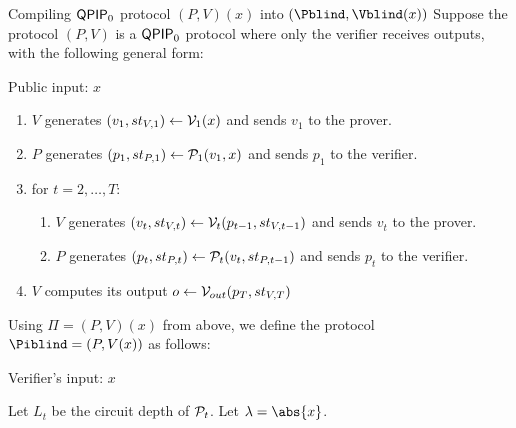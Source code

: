 \begin{protocol}{Compiling $\operatorname{\mathsf{QPIP}}_0$ protocol $(P, V)(x)$ into $(\Pblind, \Vblind(x))$}
	Suppose the protocol $(P, V)$ is a $\operatorname{\mathsf{QPIP}}_0$ protocol where only the verifier receives outputs, with the following general form:
	
	Public input: $x$
	\begin{enumerate}
		\item $V$ generates $(v_1, st_{V, 1})\leftarrow\mathcal{V}_1(x)$ and sends $v_1$ to the prover.
		\item $P$ generates $(p_1, st_{P, 1})\leftarrow\mathcal{P}_1(v_1, x)$ and sends $p_1$ to the verifier.
		\item for $t=2,\ldots,T$:
		\begin{enumerate}
			\item $V$ generates $(v_t, st_{V, t})\leftarrow\mathcal{V}_t(p_{t-1}, st_{V, t-1})$ and sends $v_t$ to the prover.
			\item $P$ generates $(p_t, st_{P, t})\leftarrow\mathcal{P}_t(v_t, st_{P, t-1})$ and sends $p_t$ to the verifier.
		\end{enumerate}
		\item $V$ computes its output $o\leftarrow\mathcal{V}_{out}(p_T, st_{V, T})$
	\end{enumerate}

	Using $\Pi=(P, V)(x)$ from above, we define the protocol $\Piblind=(P, V(x))$ as follows:

	Verifier's input: $x$

	Let $L_t$ be the circuit depth of $\mathcal{P}_t$.
	Let $\lambda=\abs{x}$.


\end{protocol}
